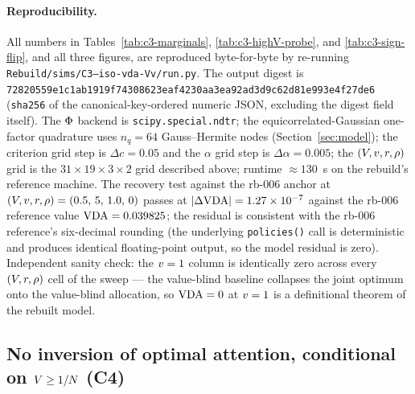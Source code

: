 \paragraph{Reproducibility.}
All numbers in Tables~\ref{tab:c3-marginals},
\ref{tab:c3-highV-probe}, and \ref{tab:c3-sign-flip}, and all
three figures, are reproduced byte-for-byte by re-running
\texttt{Rebuild/sims/C3--iso-vda-Vv/run.py}. The output digest is
\texttt{72820559e1c1ab1919f74308623eaf4230aa3ea92ad3d9c62d81e993e4f27de6}
(\texttt{sha256} of the canonical-key-ordered numeric JSON,
excluding the digest field itself). The $\Phi$ backend is
\texttt{scipy.special.ndtr}; the equicorrelated-Gaussian one-factor
quadrature uses $n_q = 64$ Gauss--Hermite nodes (Section~\ref{sec:model});
the criterion grid step is $\Delta c = 0.05$ and the $\alpha$ grid
step is $\Delta\alpha = 0.005$; the $(V, v, r, \rho)$
grid is the $31 \times 19 \times 3 \times 2$ grid described above;
runtime $\approx 130$~s on the rebuild's reference machine. The
recovery test against the rb-006 anchor at $(V, v, r,
\rho) = (0.5,\,5,\,1.0,\,0)$ passes at $|\Delta \mathrm{VDA}| =
1.27 \times 10^{-7}$ against the rb-006 reference value
$\mathrm{VDA} = 0.039825$; the residual is consistent with the rb-006
reference's six-decimal rounding (the underlying \texttt{policies()}
call is deterministic and produces identical floating-point output,
so the model residual is zero). Independent sanity check: the
$v = 1$ column is identically zero across every $(V,
r, \rho)$ cell of the sweep --- the value-blind baseline
collapses the joint optimum onto the value-blind allocation, so
$\mathrm{VDA} = 0$ at $v = 1$ is a definitional theorem of the rebuilt
model.

\subsection{No inversion of optimal attention, conditional on $V
            \ge 1/N$ (C4)}
\label{sec:results-c4}

